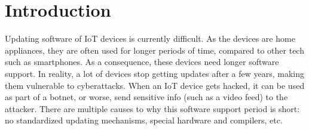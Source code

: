 \chapter{Introduction}
\label{chap:intro}

% 
% 
% 



Updating software of \acrfull{IoT} devices is currently difficult. As the devices are home appliances, they are often used for longer periods of time, compared to other tech such as smartphones. As a consequence, these devices need longer software support. In reality, a lot of devices stop getting updates after a few years, making them vulnerable to cyberattacks. When an \acrshort{IoT} device gets hacked, it can be used as part of a botnet, or worse, send sensitive info (such as a video feed) to the attacker. There are multiple causes to why this software support period is short: no standardized updating mechanisms, special hardware and compilers, etc. \cite{wasi_iot}

